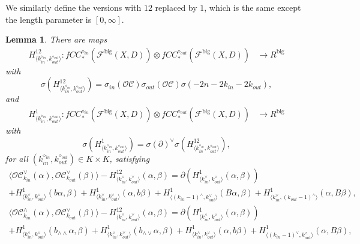 \documentclass{article}
\newtheorem{lem}{Lemma}[section]
\def\fuk{\EuF}
\def\cO{\mathcal{O}}
\def\cC{\mathcal{C}}
\def\fuk{\mathcal{F}}
\def\big{{\operatorname{big}}}
\begin{document}
We similarly define the versions with $12$ replaced by $1$, which is the same except the length parameter is $[0,\infty]$.

\begin{lem}\label{lem:cardy triv}
    There are maps
    \begin{align*}
        H^{12}_{\langle k_{in}^{\diamond_{in}},k_{out}^{\diamond_{out}}\rangle}: fCC^{\diamond_{in}}_*(\fuk^\big(X,D))   \otimes fCC^{\diamond_{out}}_*(\fuk^\big(X,D)) &  \to R^{\big}
        \end{align*}
    with 
    $$\sigma(H^{12}_{\langle k_{in}^{\diamond_{in}},k_{out}^{\diamond_{out}}\rangle}) = \sigma_{in}(\cO\cC)\sigma_{out}(\cO\cC) \sigma(-2n-2k_{in}-2k_{out}),$$
    and
    \begin{align*}
        H^{1}_{\langle k_{in}^{\diamond_{in}},k_{out}^{\diamond_{out}}\rangle}: fCC^{\diamond_{in}}_*(\fuk^\big(X,D)) \otimes fCC^{\diamond_{out}}_*(\fuk^\big(X,D)) & \to R^\big
    \end{align*}
    with 
    $$\sigma(H^{1}_{\langle k_{in}^{\diamond_{in}},k_{out}^{\diamond_{out}}\rangle}) = \sigma(\partial)^\vee \sigma(H^{12}_{\langle k_{in}^{\diamond_{in}},k_{out}^{\diamond_{out}}\rangle}),$$
    for all $(k_{in}^{\diamond_{in}},k_{out}^{\diamond_{out}}) \in K \times K$, satisfying
    \begin{multline}
        \langle \cO\cC^\vee_{k_{in}}(\alpha),\cO\cC^\vee_{k_{out}}(\beta) \rangle - H^{12}_{\langle k^\vee_{in},k^\vee_{out}\rangle}(\alpha,\beta) = \partial(H^1_{\langle k^\vee_{in},k^\vee_{out}\rangle}(\alpha,\beta)) \\+ H^1_{\langle k^\vee_{in},k^\vee_{out}\rangle}(b\alpha,\beta) + H^1_{\langle k^\vee_{in},k^\vee_{out}\rangle}(\alpha,b\beta) + H^1_{\langle (k_{in}-1)^\wedge,k^\vee_{out}\rangle}(B\alpha,\beta) + H^1_{\langle k^\vee_{in},(k_{out}-1)^\wedge\rangle}(\alpha,B\beta),
    \end{multline}
    \begin{multline}\label{eq:hat check}
        \langle \cO\cC^\wedge_{k_{in}}(\alpha),\cO\cC^\vee_{k_{out}}(\beta) \rangle - H^{12}_{\langle k^\wedge_{in},k^\vee_{out}\rangle}(\alpha,\beta) = \partial(H^1_{\langle k^\wedge_{in},k^\vee_{out}\rangle}(\alpha,\beta)) \\+ H^1_{\langle k^\wedge_{in},k^\vee_{out}\rangle}(b_{\wedge\wedge}\alpha,\beta) + H^1_{\langle k^\vee_{in},k^\vee_{out}\rangle}(b_{\wedge\vee}\alpha,\beta) + H^1_{\langle k^\wedge_{in},k^\vee_{out}\rangle}(\alpha,b\beta) + H^1_{\langle (k_{in}-1)^\vee,k^\wedge_{out}\rangle}(\alpha,B\beta),

\end{multline}
\end{lem}
\end{document}
